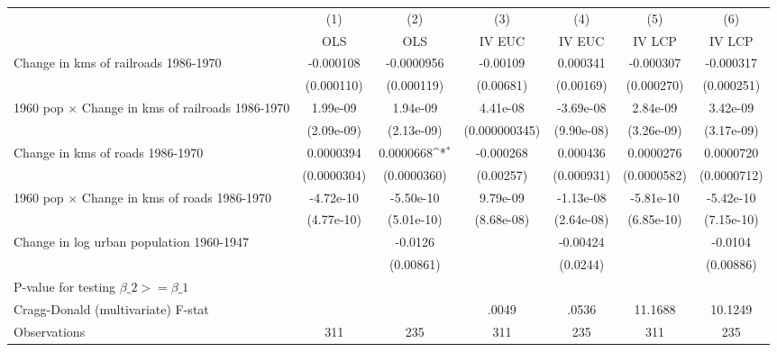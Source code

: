 {
\def\sym#1{\ifmmode^{#1}\else\(^{#1}\)\fi}
\begin{tabular}{l*{6}{c}}
\hline\hline
                &\multicolumn{1}{c}{(1)}&\multicolumn{1}{c}{(2)}&\multicolumn{1}{c}{(3)}&\multicolumn{1}{c}{(4)}&\multicolumn{1}{c}{(5)}&\multicolumn{1}{c}{(6)}\\
                &\multicolumn{1}{c}{OLS}&\multicolumn{1}{c}{OLS}&\multicolumn{1}{c}{IV EUC}&\multicolumn{1}{c}{IV EUC}&\multicolumn{1}{c}{IV LCP}&\multicolumn{1}{c}{IV LCP}\\
\hline
Change in kms of railroads 1986-1970&-0.000108         &-0.0000956         & -0.00109         & 0.000341         &-0.000307         &-0.000317         \\
                &(0.000110)         &(0.000119)         &(0.00681)         &(0.00169)         &(0.000270)         &(0.000251)         \\
[1em]
1960 pop $\times$ Change in kms of railroads 1986-1970& 1.99e-09         & 1.94e-09         & 4.41e-08         &-3.69e-08         & 2.84e-09         & 3.42e-09         \\
                &(2.09e-09)         &(2.13e-09)         &(0.000000345)         &(9.90e-08)         &(3.26e-09)         &(3.17e-09)         \\
[1em]
Change in kms of roads 1986-1970&0.0000394         &0.0000668\sym{*}  &-0.000268         & 0.000436         &0.0000276         &0.0000720         \\
                &(0.0000304)         &(0.0000360)         &(0.00257)         &(0.000931)         &(0.0000582)         &(0.0000712)         \\
[1em]
1960 pop $\times$ Change in kms of roads 1986-1970&-4.72e-10         &-5.50e-10         & 9.79e-09         &-1.13e-08         &-5.81e-10         &-5.42e-10         \\
                &(4.77e-10)         &(5.01e-10)         &(8.68e-08)         &(2.64e-08)         &(6.85e-10)         &(7.15e-10)         \\
[1em]
Change in log urban population 1960-1947&                  &  -0.0126         &                  & -0.00424         &                  &  -0.0104         \\
                &                  &(0.00861)         &                  & (0.0244)         &                  &(0.00886)         \\
\hline
P-value for testing $\beta\_{2} >= \beta\_{1}$&                  &                  &                  &                  &                  &                  \\
Cragg-Donald (multivariate) F-stat&                  &                  &    .0049         &    .0536         &  11.1688         &  10.1249         \\
Observations    &      311         &      235         &      311         &      235         &      311         &      235         \\
\hline\hline
\end{tabular}
}
